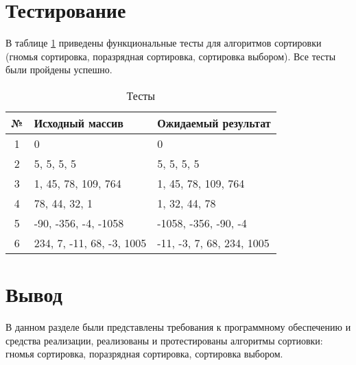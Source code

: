 \section{Тестирование}

В таблице \ref{test} приведены функциональные тесты для алгоритмов сортировки (гномья сортировка, поразрядная сортировка, сортировка выбором). Все тесты были пройдены успешно.

\begin{table}[h]
	\begin{center}
		\caption{\label{test} Тесты}
\begin{tabular}{| c | l | l | }
	\hline
	№ & Исходный массив & Ожидаемый результат \\ \hline
	1 & 0 & 0 \\
	\hline
	2 & 5, 5, 5, 5 & 5, 5, 5, 5 \\
	\hline
	3 & 1, 45, 78, 109, 764 & 1, 45, 78, 109, 764 \\
	\hline
	4 & 78, 44, 32, 1 & 1, 32, 44, 78 \\
	\hline
	5 & -90, -356, -4, -1058 & -1058, -356, -90, -4\\
	\hline
	6 & 234, 7, -11, 68, -3, 1005 & -11, -3, 7, 68, 234, 1005\\
	\hline
\end{tabular}
	\end{center}
\end{table}

\section*{Вывод}

В данном разделе были представлены требования к программному обеспечению и средства реализации, реализованы и протестированы алгоритмы сортиовки: гномья сортировка, поразрядная сортировка, сортировка выбором.

